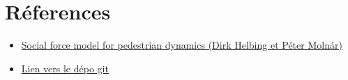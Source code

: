 \documentclass[a4paper,12pt]{article}
\begin{document}
\newpage

\section{Réferences}


\vspace{1em}

\begin{itemize}
	\item \href{https://journals.aps.org/pre/abstract/10.1103/PhysRevE.51.4282}{Social force model for pedestrian dynamics (Dirk Helbing et Péter Molnár)}
	\item \href{https://github.com/antoninnad/etude_des_foules}{Lien vers le dépo git}
\end{itemize}
\end{document}
